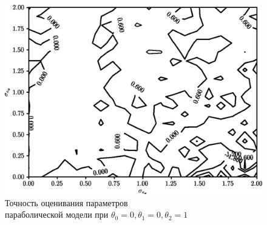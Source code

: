 \begin{figure}[b]
  \centering
  \includegraphics[width=135mm]{fig/nonlinear/quadratic/a-0_b-0_c-1.png}
  \caption{
    Точность оценивания параметров \\
    параболической модели при \( \theta_0 = 0, \theta_1 = 0, \theta_2 = 1 \)
  }\label{fig:comparison_nonlinear_quadratic_a-0_b-0_c-1}
\end{figure}

